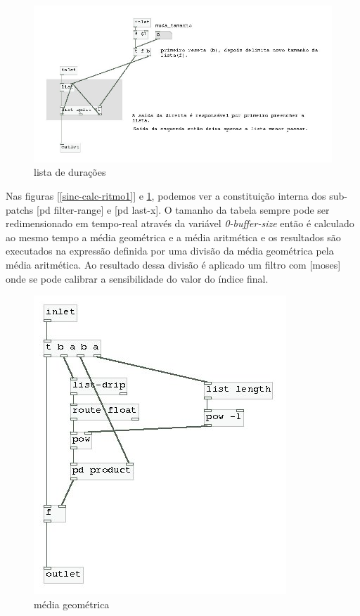 \documentclass[draft]{ppgmus}
\begin{document}
\begin{figure}
\includegraphics[scale=.6]{sinc-calc-ritmo2}
\caption{lista de durações}
\label{[sinc-calc-ritmo2]}
\end{figure}

Nas figuras \ref{[sinc-calc-ritmo1]} e \ref{[sinc-calc-ritmo2]}, podemos
ver a constituição interna dos sub-patchs [pd filter-range] e [pd last-x].
O tamanho da tabela sempre pode ser redimensionado em tempo-real através
da variável \textit{0-buffer-size} então é calculado ao mesmo tempo a média geométrica
e a média aritmética e os resultados são executados na expressão definida por uma
divisão da média geométrica pela média aritmética. %
Ao resultado dessa divisão é aplicado um filtro com [moses] onde se pode calibrar
a sensibilidade do valor do índice final.




\begin{figure}
\includegraphics[scale=.6]{sinc-calc-ritmo3}
\caption{média geométrica}
\label{[sinc-calc-ritmo3]}
\end{figure}
\end{document}
